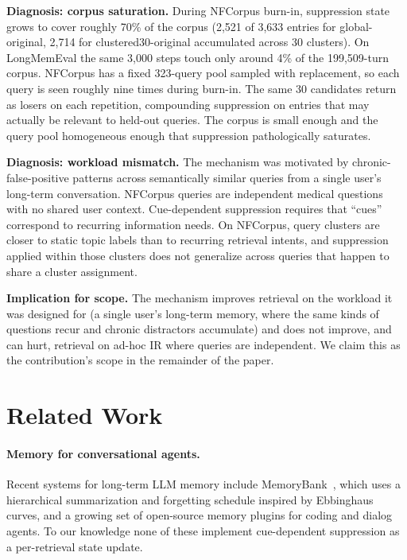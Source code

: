 \documentclass[11pt,a4paper]{article}
\begin{document}
\textbf{Diagnosis: corpus saturation.} During NFCorpus burn-in, suppression state grows to cover roughly 70\% of the corpus (2,521 of 3,633 entries for global-original, 2,714 for clustered30-original accumulated across 30 clusters). On LongMemEval the same 3,000 steps touch only around 4\% of the 199,509-turn corpus. NFCorpus has a fixed 323-query pool sampled with replacement, so each query is seen roughly nine times during burn-in. The same 30 candidates return as losers on each repetition, compounding suppression on entries that may actually be relevant to held-out queries. The corpus is small enough and the query pool homogeneous enough that suppression pathologically saturates.

\textbf{Diagnosis: workload mismatch.} The mechanism was motivated by chronic-false-positive patterns across semantically similar queries from a single user's long-term conversation. NFCorpus queries are independent medical questions with no shared user context. Cue-dependent suppression requires that ``cues'' correspond to recurring information needs. On NFCorpus, query clusters are closer to static topic labels than to recurring retrieval intents, and suppression applied within those clusters does not generalize across queries that happen to share a cluster assignment.

\textbf{Implication for scope.} The mechanism improves retrieval on the workload it was designed for (a single user's long-term memory, where the same kinds of questions recur and chronic distractors accumulate) and does not improve, and can hurt, retrieval on ad-hoc IR where queries are independent. We claim this as the contribution's scope in the remainder of the paper.

\section{Related Work}

\paragraph{Memory for conversational agents.} Recent systems for long-term LLM memory include MemoryBank~\citep{zhong2024memorybank}, which uses a hierarchical summarization and forgetting schedule inspired by Ebbinghaus curves, and a growing set of open-source memory plugins for coding and dialog agents. To our knowledge none of these implement cue-dependent suppression as a per-retrieval state update.
\end{document}
